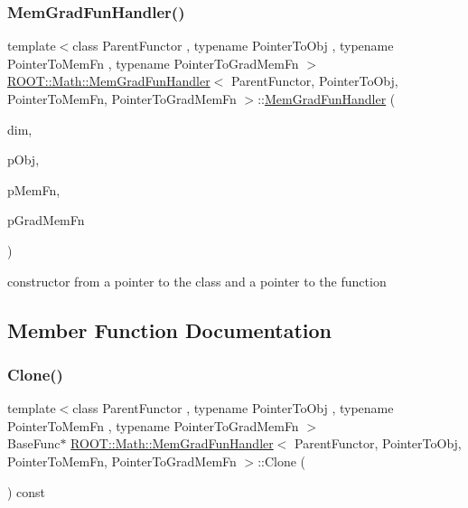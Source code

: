 \subsubsection{\texorpdfstring{MemGradFunHandler()}{MemGradFunHandler()}\hspace{0.1cm}{\footnotesize\ttfamily [6/6]}}
{\footnotesize\ttfamily template$<$class Parent\+Functor , typename Pointer\+To\+Obj , typename Pointer\+To\+Mem\+Fn , typename Pointer\+To\+Grad\+Mem\+Fn $>$ \\
\mbox{\hyperlink{classROOT_1_1Math_1_1MemGradFunHandler}{R\+O\+O\+T\+::\+Math\+::\+Mem\+Grad\+Fun\+Handler}}$<$ Parent\+Functor, Pointer\+To\+Obj, Pointer\+To\+Mem\+Fn, Pointer\+To\+Grad\+Mem\+Fn $>$\+::\mbox{\hyperlink{classROOT_1_1Math_1_1MemGradFunHandler}{Mem\+Grad\+Fun\+Handler}} (\begin{DoxyParamCaption}\item[{unsigned int}]{dim,  }\item[{const Pointer\+To\+Obj \&}]{p\+Obj,  }\item[{Pointer\+To\+Mem\+Fn}]{p\+Mem\+Fn,  }\item[{Pointer\+To\+Grad\+Mem\+Fn}]{p\+Grad\+Mem\+Fn }\end{DoxyParamCaption})\hspace{0.3cm}{\ttfamily [inline]}}



constructor from a pointer to the class and a pointer to the function 



\subsection{Member Function Documentation}
\mbox{\label{classROOT_1_1Math_1_1MemGradFunHandler_a987e3b1a8492990c3c2a5c3eca9964a6}} 
\subsubsection{\texorpdfstring{Clone()}{Clone()}\hspace{0.1cm}{\footnotesize\ttfamily [1/3]}}
{\footnotesize\ttfamily template$<$class Parent\+Functor , typename Pointer\+To\+Obj , typename Pointer\+To\+Mem\+Fn , typename Pointer\+To\+Grad\+Mem\+Fn $>$ \\
Base\+Func$\ast$ \mbox{\hyperlink{classROOT_1_1Math_1_1MemGradFunHandler}{R\+O\+O\+T\+::\+Math\+::\+Mem\+Grad\+Fun\+Handler}}$<$ Parent\+Functor, Pointer\+To\+Obj, Pointer\+To\+Mem\+Fn, Pointer\+To\+Grad\+Mem\+Fn $>$\+::Clone (\begin{DoxyParamCaption}{ }\end{DoxyParamCaption}) const\hspace{0.3cm}{\ttfamily [inline]}}


